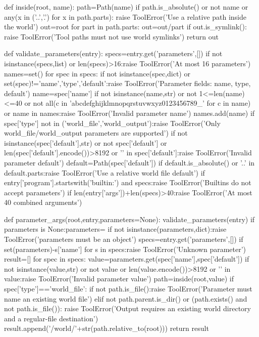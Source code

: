 def inside(root, name):
    path=Path(name)
    if path.is_absolute() or not name or any(x in ('..','.') for x in path.parts):
        raise ToolError('Use a relative path inside the world')
    out=root
    for part in path.parts:
        out=out/part
        if out.is_symlink():
            raise ToolError('Tool paths must not use world symlinks')
    return out


def validate_parameters(entry):
    specs=entry.get('parameters',[])
    if not isinstance(specs,list) or len(specs)>16:raise ToolError('At most 16 parameters')
    names=set()
    for spec in specs:
        if not isinstance(spec,dict) or set(spec)!={'name','type','default'}:raise ToolError('Parameter fields: name, type, default')
        name=spec['name']
        if not isinstance(name,str) or not 1<=len(name)<=40 or not all(c in 'abcdefghijklmnopqrstuvwxyz0123456789_' for c in name) or name in names:raise ToolError('Invalid parameter name')
        names.add(name)
        if spec['type'] not in ('world_file','world_output'):raise ToolError('Only world_file/world_output parameters are supported')
        if not isinstance(spec['default'],str) or not spec['default'] or len(spec['default'].encode())>8192 or '\0' in spec['default']:raise ToolError('Invalid parameter default')
        default=Path(spec['default'])
        if default.is_absolute() or '..' in default.parts:raise ToolError('Use a relative world file default')
    if entry['program'].startswith('builtin:') and specs:raise ToolError('Builtins do not accept parameters')
    if len(entry['args'])+len(specs)>40:raise ToolError('At most 40 combined arguments')


def parameter_args(root,entry,parameters=None):
    validate_parameters(entry)
    if parameters is None:parameters={}
    if not isinstance(parameters,dict):raise ToolError('parameters must be an object')
    specs=entry.get('parameters',[])
    if set(parameters)-{s['name'] for s in specs}:raise ToolError('Unknown parameter')
    result=[]
    for spec in specs:
        value=parameters.get(spec['name'],spec['default'])
        if not isinstance(value,str) or not value or len(value.encode())>8192 or '\0' in value:raise ToolError('Invalid parameter value')
        path=inside(root,value)
        if spec['type']=='world_file':
            if not path.is_file():raise ToolError('Parameter must name an existing world file')
        elif not path.parent.is_dir() or (path.exists() and not path.is_file()):
            raise ToolError('Output requires an existing world directory and a regular-file destination')
        result.append('/world/'+str(path.relative_to(root)))
    return result


